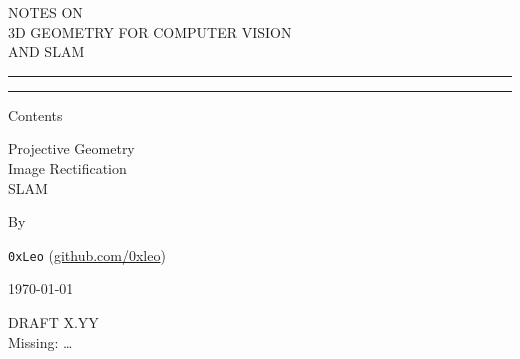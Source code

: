 \begin{titlepage}
	\vspace{0.75\baselineskip} %
	
	{\LARGE NOTES ON\\ \Large 3D GEOMETRY FOR COMPUTER VISION\\ \Large AND SLAM} %
	
	\vspace{0.75\baselineskip} %
	
	\rule{\textwidth}{0.4pt}\vspace*{-\baselineskip}\vspace{3.2pt} %
	\rule{\textwidth}{1.6pt} %
	
	\vspace{2\baselineskip} %
	
	Contents
	
	\vspace*{3\baselineskip} %
	
	Projective Geometry\\
	Image Rectification\\
	SLAM
	
	\vspace*{3\baselineskip} %
	
	
	By
	
	\vspace{0.5\baselineskip} %
	
	{\normalfont \Large \texttt{0xLeo} (\url{github.com/0xleo}) \\} %
	
	\vspace{0.5\baselineskip} %
	
	
	\vfill %
	
	
	
	\vspace{0.3\baselineskip} %
	
	\today %
	
	{DRAFT X.YY} %
	{\\Missing: \ldots}

\end{titlepage}

